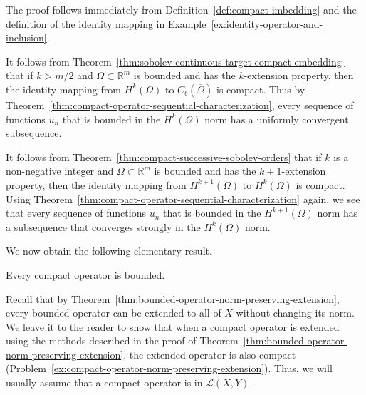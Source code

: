 The proof follows immediately from Definition~\ref{def:compact-imbedding} and the definition of the identity mapping in Example~\ref{ex:identity-operator-and-inclusion}.

\begin{Example}
\label{ex:sobolev-continuous-target-compact-operator}
It follows from Theorem~\ref{thm:sobolev-continuous-target-compact-embedding} that if $k>m/2$ and $\Omega\subset\mathbb{R}^m$ is bounded and has the $k$-extension property, then the identity mapping from $H^k(\Omega)$ to $C_b(\overline\Omega)$ is compact. Thus by Theorem~\ref{thm:compact-operator-sequential-characterization}, every sequence of functions $u_n$ that is bounded in the $H^k(\Omega)$ norm has a uniformly convergent subsequence.
\end{Example}

\begin{Example}
\label{ex:successive-sobolev-orders-compact-operator}
It follows from Theorem~\ref{thm:compact-successive-sobolev-orders} that if $k$ is a non-negative integer and $\Omega\subset\mathbb{R}^m$ is bounded and has the $k+1$-extension property, then the identity mapping from $H^{k+1}(\Omega)$ to $H^k(\Omega)$ is compact. Using Theorem~\ref{thm:compact-operator-sequential-characterization} again, we see that every sequence of functions $u_n$ that is bounded in the $H^{k+1}(\Omega)$ norm has a subsequence that converges strongly in the $H^k(\Omega)$ norm.
\end{Example}

We now obtain the following elementary result.

\begin{Lemma}
\label{lem:compact-operator-boundedness}
Every compact operator is bounded.
\end{Lemma}

\begingroup
{}
\renewcommand{\endProof}{\par\nobreak\hfill$\blacksquare$\par\vspace{0.1cm}}
\endgroup

Recall that by Theorem~\ref{thm:bounded-operator-norm-preserving-extension}, every bounded operator can be extended to all of $X$ without changing its norm. We leave it to the reader to show that when a compact operator is extended using the methods described in the proof of Theorem~\ref{thm:bounded-operator-norm-preserving-extension}, the extended operator is also compact (Problem~\ref{ex:compact-operator-norm-preserving-extension}). Thus, we will usually assume that a compact operator is in $\mathcal{L}(X,Y)$.

